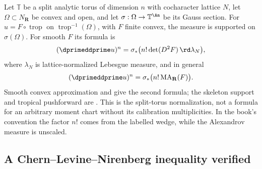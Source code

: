 \begin{example}
\label{ex:ch16-toric-normalization}
Let $\mathbb T$ be a split analytic torus of dimension $n$ with
cocharacter lattice $N$, let $\Omega\subset N_{\mathbf R}$ be convex and
open, and let $\sigma:\Omega\to\mathbb T^{\An}$ be its Gauss section.
For $u=F\circ\operatorname{trop}$ on
$\operatorname{trop}^{-1}(\Omega)$, with $F$ finite convex, the measure is
supported on $\sigma(\Omega)$.  For smooth $F$ its formula is
\[
 (\dprimeddprime u)^n
 =\sigma_*\bigl(n!\det(D^2F)\,\rd\lambda_N\bigr),
\]
where $\lambda_N$ is lattice-normalized Lebesgue measure, and in general
\[
 (\dprimeddprime u)^n
 =\sigma_*\bigl(n!\operatorname{MA}_{\mathbf R}(F)\bigr).
\]
Smooth convex approximation and  give the
second formula; the skeleton support and tropical pushforward are
\cite[Propositions~6.3.1 and~6.3.3]{BGJKK25}.  This is the split-torus
normalization, not a formula for an arbitrary moment chart without its
calibration multiplicities.  In the book's convention the factor $n!$
comes from the labelled wedge, while the Alexandrov measure is unscaled.
\end{example}

\subsection{A Chern--Levine--Nirenberg inequality verified}
\label{sec:ch16-worked-cln}

